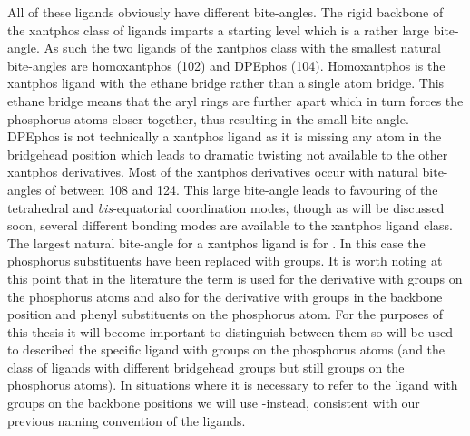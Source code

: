 All of these ligands obviously have different bite-angles.  The rigid backbone of the xantphos class of ligands imparts a starting level which is a rather large bite-angle.  As such the two ligands of the xantphos class with the smallest natural bite-angles are homoxantphos (102\degrees{}) and DPEphos (104\degrees).  Homoxantphos is the xantphos ligand with the ethane bridge rather than a single atom bridge.  This ethane bridge means that the aryl rings are further apart which in turn forces the phosphorus atoms closer together, thus resulting in the small bite-angle.  DPEphos is not technically a xantphos ligand as it is missing any atom in the bridgehead position which leads to dramatic twisting not available to the other xantphos derivatives.  Most of the xantphos derivatives occur with natural bite-angles of between 108\degrees{} and 124\degrees.  This large bite-angle leads to favouring of the tetrahedral and \emph{bis}-equatorial coordination modes, though as will be discussed soon, several different bonding modes are available to the xantphos ligand class.  The largest natural bite-angle for a xantphos ligand is for \tBuxantphos{}.  In this case the phosphorus substituents have been replaced with \tBu{} groups.  It is worth noting at this point that in the literature the term \tBuxantphos{} is used for the derivative with \tBu{} groups on the phosphorus atoms and also for the derivative with \tBu{} groups in the backbone position and phenyl substituents on the phosphorus atom.  For the purposes of this thesis it will become important to distinguish between them so \tBuxantphos{} will be used to described the specific ligand with \tBu{} groups on the phosphorus atoms (and the class of ligands with different bridgehead groups but still \tBu{} groups on the phosphorus atoms).  In situations where it is necessary to refer to the ligand with \tBu{} groups on the backbone positions we will use \tBu-\Phxantphos instead, consistent with our previous naming convention of the \Phxantphos{} ligands.

